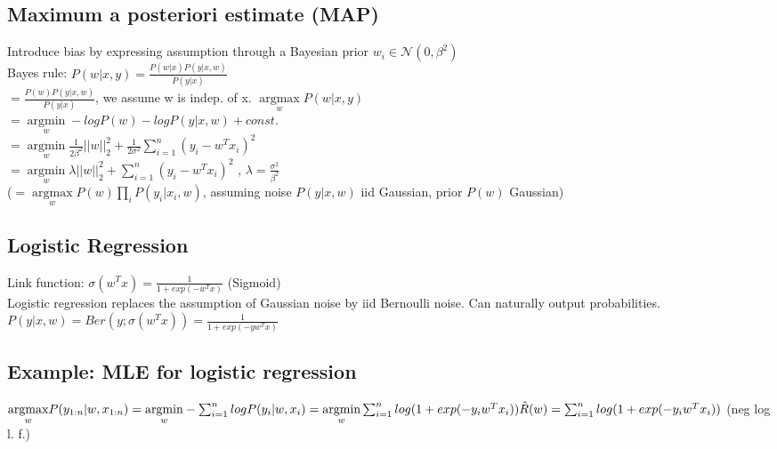 \subsection*{Maximum a posteriori estimate (MAP)}
Introduce bias by expressing assumption through a Bayesian prior $w_i \in \mathcal{N}(0, \beta^2)$\\
Bayes rule: $P(w|x,y) = \frac{P(w|x) P(y|x,w)}{P(y|x)}$\\
$ = \frac{P(w) P(y|x,w)}{P(y|x)}$, we assume w is indep. of x.
$ \underset{w}{\operatorname{argmax}} P(w|x,y)$\\ 
$= \underset{w}{\operatorname{argmin}} - log P(w) - log P(y|x,w) + const.$ \\
$= \underset{w}{\operatorname{argmin}} \frac{1}{2\beta^2} ||w||_2^2 + \frac{1}{2\sigma^2} \sum_{i=1}^n (y_i - w^Tx_i)^2$ \\
$= \underset{w}{\operatorname{argmin}} \lambda ||w||_2^2 + \sum_{i=1}^n (y_i - w^Tx_i)^2$ , $\lambda = \frac{\sigma^2}{\beta^2}$\\
($=\underset{w}{\operatorname{argmax}} P(w) \prod_i P(y_i|x_i,w)$, assuming noise $P(y|x,w)$ iid Gaussian, prior $P(w)$ Gaussian)

\subsection*{Logistic Regression}
Link function: $\sigma(w^Tx) = \frac{1}{1+exp(-w^Tx)}$ (Sigmoid)\\
Logistic regression replaces the assumption of Gaussian noise by iid Bernoulli noise. Can naturally output probabilities.\\
$P(y|x,w) = Ber(y; \sigma(w^Tx)) = \frac{1}{1+exp(-y w^T x)}$\\

\subsection*{Example: MLE for logistic regression}
$\underset{w}{\operatorname{argmax}} P(y_{1:n}|w,x_{1:n})\\
= \underset{w}{\operatorname{argmin}} - \sum_{i=1}^n log P(y_i|w,x_i)\\
= \underset{w}{\operatorname{argmin}} \sum_{i=1}^n log(1+exp(-y_i w^T x_i))\\
\hat{R}(w) = \sum_{i=1}^n log(1+exp(-y_i w^T x_i))$ (neg log l. f.)

